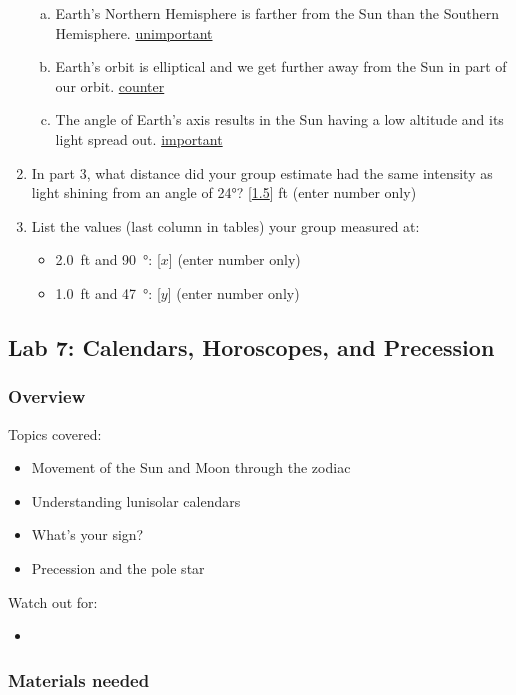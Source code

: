 \documentclass[12pt]{article}
\begin{document}
\begin{enumerate}
\begin{enumerate}[a.]
    \item Earth's Northern Hemisphere is farther from the Sun than the Southern Hemisphere. \underline{unimportant}
    \item Earth's orbit is elliptical and we get further away from the Sun in part of our orbit. \underline{counter}
    \item The angle of Earth's axis results in the Sun having a low altitude and its light spread out. \underline{important}
\end{enumerate}
\item
In part 3, what distance did your group estimate had the same intensity as light shining from an angle of 24°? [\underline{1.5}] ft (enter number only)
\item
List the values (last column in tables) your group measured at:
\begin{itemize}
    \item \SI{2.0}{ft} and \SI{90}{\degree}: [$x$] (enter number only)
    \item \SI{1.0}{ft} and \SI{47}{\degree}: [$y$] (enter number only)
\end{itemize}
\end{enumerate}


\newpage
\subsection{Lab 7: Calendars, Horoscopes, and Precession}%

\subsubsection{Overview}

Topics covered:
\begin{itemize}
\item Movement of the Sun and Moon through the zodiac
\item Understanding lunisolar calendars
\item What’s your sign?
\item Precession and the pole star
\end{itemize}

\noindent
Watch out for:
\begin{itemize}
\item 
\end{itemize}


\subsubsection{Materials needed}
\end{document}
